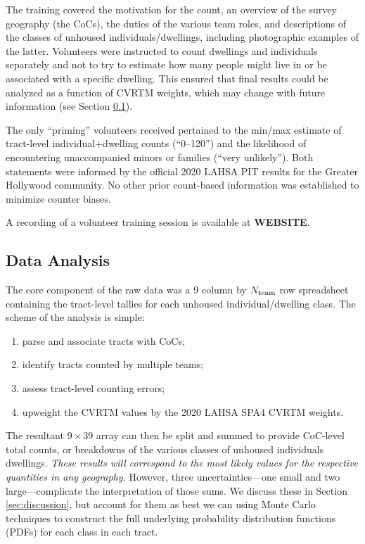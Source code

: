 \documentclass[11pt,twocolumn]{article}
\def\bfr{\bf\color{red}}
\def\Count{count}
\begin{document}
The training covered the motivation for the \Count, an overview of the survey geography (the CoCs), 
the duties of the various team roles, and descriptions of the classes of unhoused individuals/dwellings,
including photographic examples of the latter. Volunteers were instructed to count dwellings and 
individuals separately and not to try to estimate how many people might live in or be associated with a 
specific dwelling. This ensured that final results could be analyzed as a function of CVRTM weights, 
which may change with future information (see Section \ref{sec:analysis}).

The only ``priming'' volunteers received pertained to the min/max estimate of tract-level 
individual+dwelling counts (``0--120'') and the likelihood of encountering unaccompanied minors or 
families (``very unlikely''). Both statements were informed by the official 2020 LAHSA PIT results
for the Greater Hollywood community. No other prior count-based information was established to 
minimize counter biases.

A recording of a volunteer training session is available at {\bfr WEBSITE}.

\subsection{Data Analysis}
\label{sec:analysis}

The core component of the raw data was a 9 column by $N_{\rm team}$ row spreadsheet containing the
tract-level tallies for each unhoused individual/dwelling class. The scheme of the analysis is simple:
\begin{enumerate}
	\item parse and associate tracts with CoCs;
	\item identify tracts counted by multiple teams;
	\item assess tract-level counting errors;
	\item upweight the CVRTM values by the 2020 LAHSA SPA4 CVRTM weights.
\end{enumerate}
The resultant $9\times39$ array can then be split and summed to provide CoC-level total counts, 
or breakdowns of the various classes of unhoused individuals dwellings. {\it These results will
correspond to the most likely values for the respective quantities in any geography.} However,
three uncertainties---one small and two large---complicate the interpretation of those sums. 
We discuss these in Section \ref{sec:discussion}, but account for them as best we can using 
Monte Carlo techniques to construct the full underlying probability distribution functions (PDFs) 
for each class in each tract.
\end{document}
